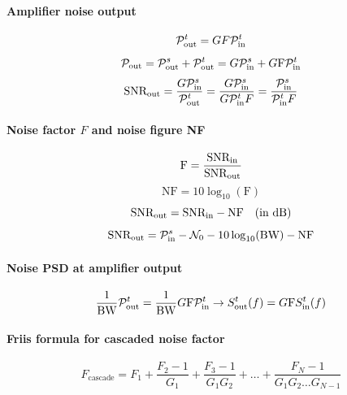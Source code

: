 \paragraph{Amplifier noise output}
\begin{equation}
{\cal P}_{\textrm{out}}^{t} = G F {\cal P}_{\textrm{in}}^{t}
\label{eq:simplifiedExpressionForNoiseOutput}
\end{equation}
\begin{equation}
{\cal P}_{\textrm{out}} = {\cal P}_{\textrm{out}}^{s} + {\cal P}_{\textrm{out}}^{t} = G {\cal P}_{\textrm{in}}^{s} + G \textrm{F} {\cal P}_{\textrm{in}}^{t}
\label{eq:amplifierOutputPower}
\end{equation}
\begin{equation}
{\textrm{SNR}}_{\textrm{out}} = \frac{G{\cal P}_{\textrm{in}}^{s}}{{\cal P}_{\textrm{out}}^{t}} = \frac{G{\cal P}_{\textrm{in}}^{s}}{G {\cal P}_{\textrm{in}}^{t}F} = \frac{{\cal P}_{\textrm{in}}^{s}}{{\cal P}_{\textrm{in}}^{t}F}
\label{eq:snrInTermsOfF}
\end{equation}

\paragraph{Noise factor $F$ and noise figure NF}
\begin{equation}
\textrm{F}  = \frac{{\textrm{SNR}}_{\textrm{in}}}{{\textrm{SNR}}_{\textrm{out}}}
\label{eq:noiseFactor2}
\end{equation}
\begin{equation}
\textrm{NF} = 10 \log_{10} \left( \textrm{F} \right)
\label{eq:noiseFigure2}
\end{equation}
\begin{equation}
{\textrm{SNR}}_{\textrm{out}} = {\textrm{SNR}}_{\textrm{in}} - \textrm{NF} \quad \text{(in dB)}
\label{eq:noiseFigure3}
\end{equation}
\begin{equation}
{\textrm{SNR}}_{\textrm{out}} = {\cal P}_{\textrm{in}}^{s} -{\cal N}_0 - 10\log_{10}({\textrm{BW}}) - \textrm{NF}
\label{eq:snrout_with_nf}
\end{equation}

\paragraph{Noise PSD at amplifier output}
\[
\frac{1}{{\textrm{BW}}} {\cal P}_{\textrm{out}}^{t} = \frac{1}{{\textrm{BW}}} G \textrm{F} {\cal P}_{\textrm{in}}^{t} \rightarrow
S_{\textrm{out}}^{t}(f) = G \textrm{F} S_{\textrm{in}}^{t}(f)
\]

\paragraph{Friis formula for cascaded noise factor}
\begin{equation}
F_{\textrm{cascade}} = F_1 + \frac{F_2-1}{G_1} + \frac{F_3-1}{G_1G_2} + \ldots + \frac{F_N-1}{G_1G_2 \ldots G_{N-1}}
\label{eq:friisNoiseFactor}
\end{equation}

